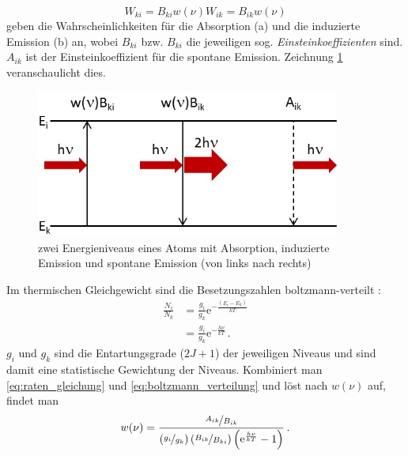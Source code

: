 \begin{subequations}\label{eq:einsteinkoeff_wkten}
	\begin{equation}\label{eq:einsteinkoeff_wkten_ik}
		W_{ki}=B_{ki}w(\nu)
	\end{equation}
	\begin{equation}\label{eq:einsteinkoeff_wkten_ki}
		W_{ik}=B_{ik}w(\nu)
	\end{equation}	
\end{subequations}
geben die Wahrscheinlichkeiten für die Absorption (a) und die induzierte
Emission (b) an, wobei $B_{ki}$ bzw. $B_{ki}$ die jeweiligen sog.
\textit{Einsteinkoeffizienten} sind. $A_{ik}$ ist der Einsteinkoeffizient für
die spontane Emission. Zeichnung \ref{fig:einstein_koeffizienten}
veranschaulicht dies.
\begin{figure}[h]
	\centering
	\includegraphics[width=10cm]{gfx/einstein_koeffizienten}
	\caption{zwei Energieniveaus eines Atoms mit Absorption,
	induzierte Emission und spontane Emission (von links nach
	rechts)}\label{fig:einstein_koeffizienten}
\end{figure}
Im thermischen Gleichgewicht sind die Besetzungszahlen
boltzmann-verteilt \cite{demtroeder:ex3}:
\begin{equation}\label{eq:boltzmann_verteilung}
	\begin{split}
		\frac{N_i}{N_k}&=\frac{g_i}{g_k}\mathrm{e}^{-\frac{(E_i-E_k)}{kT}}\\[0.2cm]
		&=\frac{g_i}{g_k}\mathrm{e}^{-\frac{h\nu}{kT}}\,.
	\end{split}	
\end{equation}
$g_i$ und $g_k$ sind die Entartungsgrade ($2J+1$) der jeweiligen Niveaus und
sind damit eine statistische Gewichtung der Niveaus.
Kombiniert man \eqref{eq:raten_gleichung} und \eqref{eq:boltzmann_verteilung}
und löst nach $w(\nu)$ auf, findet man
\begin{equation}\label{eq:spektrale_energiedichte_1}
	w(\nu)=\frac{\nicefrac{A_{ik}}{B_{ik}}}{\left(\nicefrac{g_i}{g_k}\right)\left(\nicefrac{B_{ik}}{B_{ki}}\right)\left(\mathrm{e}^\frac{h\nu}{kT}-1\right)}\,.
\end{equation}
